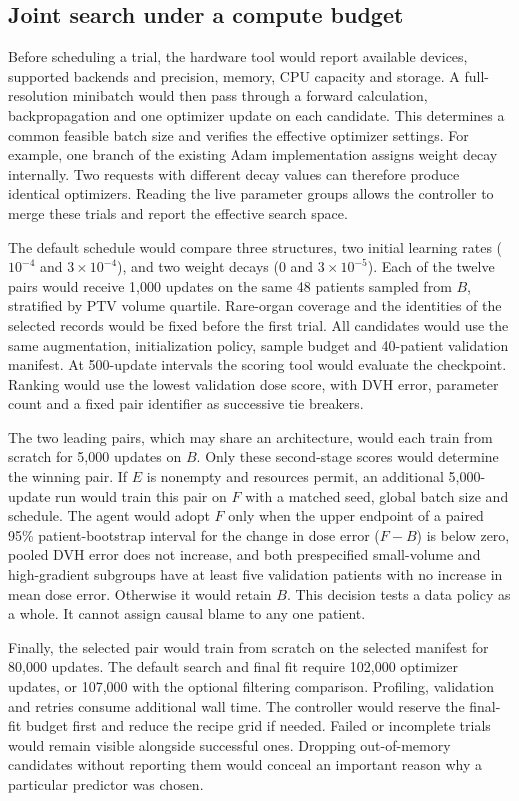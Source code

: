 \documentclass[letterpaper]{article}
\begin{document}
\subsection{Joint search under a compute budget}
Before scheduling a trial, the hardware tool would report available devices, supported backends and precision, memory, CPU capacity and storage. A full-resolution minibatch would then pass through a forward calculation, backpropagation and one optimizer update on each candidate. This determines a common feasible batch size and verifies the effective optimizer settings. For example, one branch of the existing Adam implementation assigns weight decay internally. Two requests with different decay values can therefore produce identical optimizers. Reading the live parameter groups allows the controller to merge these trials and report the effective search space.

The default schedule would compare three structures, two initial learning rates ($10^{-4}$ and $3\times10^{-4}$), and two weight decays ($0$ and $3\times10^{-5}$). Each of the twelve pairs would receive 1,000 updates on the same 48 patients sampled from $B$, stratified by PTV volume quartile. Rare-organ coverage and the identities of the selected records would be fixed before the first trial. All candidates would use the same augmentation, initialization policy, sample budget and 40-patient validation manifest. At 500-update intervals the scoring tool would evaluate the checkpoint. Ranking would use the lowest validation dose score, with DVH error, parameter count and a fixed pair identifier as successive tie breakers.

The two leading pairs, which may share an architecture, would each train from scratch for 5,000 updates on $B$. Only these second-stage scores would determine the winning pair. If $E$ is nonempty and resources permit, an additional 5,000-update run would train this pair on $F$ with a matched seed, global batch size and schedule. The agent would adopt $F$ only when the upper endpoint of a paired 95\% patient-bootstrap interval for the change in dose error ($F-B$) is below zero, pooled DVH error does not increase, and both prespecified small-volume and high-gradient subgroups have at least five validation patients with no increase in mean dose error. Otherwise it would retain $B$. This decision tests a data policy as a whole. It cannot assign causal blame to any one patient.

Finally, the selected pair would train from scratch on the selected manifest for 80,000 updates. The default search and final fit require 102,000 optimizer updates, or 107,000 with the optional filtering comparison. Profiling, validation and retries consume additional wall time. The controller would reserve the final-fit budget first and reduce the recipe grid if needed. Failed or incomplete trials would remain visible alongside successful ones. Dropping out-of-memory candidates without reporting them would conceal an important reason why a particular predictor was chosen.
\end{document}
